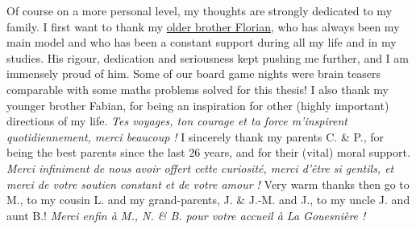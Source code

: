 \begin{acknowledgements}
Of course on a more personal level, my thoughts are strongly dedicated to my family.
%
I first want to thank my \href{https://paris-sorbonne.academia.edu/FBesson}{older brother Florian}, who has always been my main model and who has been a constant support during all my life and in my studies.
His rigour, dedication and seriousness kept pushing me further, and I am immensely proud of him.
Some of our board game nights were brain teasers comparable with some maths problems solved for this thesis!
%
I also thank my younger brother Fabian, for being an inspiration for other (highly important) directions of my life. \emph{Tes voyages, ton courage et ta force m'inspirent quotidiennement, merci beaucoup !}
I sincerely thank my parents C. \& P., for being the best parents since the last $26$ years, and for their (vital) moral support.
\emph{Merci infiniment de nous avoir offert cette curiosité, merci d'être si gentils, et merci de votre soutien constant et de votre amour !}
Very warm thanks then go to M., to my cousin L. and my grand-parents, J. \& J.-M. and J., to my uncle J. and aunt B.!
\emph{Merci enfin à M., N. \& B. pour votre accueil à La Gouesnière !}


\end{acknowledgements}
